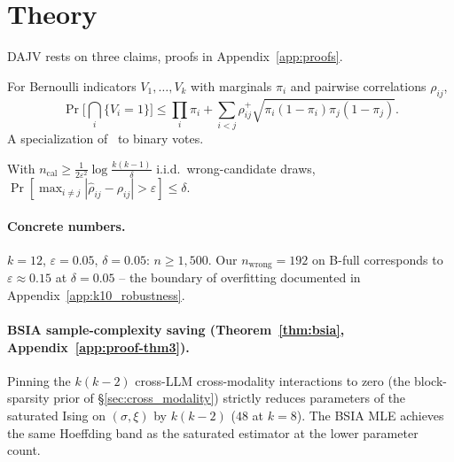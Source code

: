 \section{Theory}
\label{sec:theory}

DAJV rests on three claims, proofs in Appendix~\ref{app:proofs}.

\begin{theorem}
\label{thm:bound}
For Bernoulli indicators $V_1, \ldots, V_k$ with marginals $\pi_i$
and pairwise correlations $\rho_{ij}$,
\begin{equation*}
  \Pr\!\Big[\bigcap_{i} \{V_i = 1\}\Big]
  \leq \prod_i \pi_i + \sum_{i<j} \rho_{ij}^+ \sqrt{\pi_i(1-\pi_i)\pi_j(1-\pi_j)}.
\end{equation*}
A specialization of~\citet{balasubramanian2026ising} to binary
votes.
\end{theorem}

\begin{theorem}
\label{thm:sample}
With $n_{\text{cal}} \geq \frac{1}{2\varepsilon^2}
\log\!\frac{k(k-1)}{\delta}$ i.i.d.\ wrong-candidate draws,
$\Pr[\max_{i \neq j} |\hat\rho_{ij} - \rho_{ij}| > \varepsilon]
\leq \delta$.
\end{theorem}

\paragraph{Concrete numbers.} $k = 12$, $\varepsilon = 0.05$,
$\delta = 0.05$: $n \geq 1{,}500$. Our $n_{\text{wrong}} = 192$
on B-full corresponds to $\varepsilon \approx 0.15$ at
$\delta = 0.05$ -- the boundary of overfitting documented in
Appendix~\ref{app:k10_robustness}.

\paragraph{BSIA sample-complexity saving
(Theorem~\ref{thm:bsia}, Appendix~\ref{app:proof-thm3}).}
Pinning the $k(k-2)$ cross-LLM cross-modality interactions to
zero (the block-sparsity prior of \S\ref{sec:cross_modality})
strictly reduces parameters of the saturated Ising on
$(\sigma, \xi)$ by $k(k-2)$ ($48$ at $k=8$). The BSIA MLE
achieves the same Hoeffding band as the saturated estimator at
the lower parameter count.
